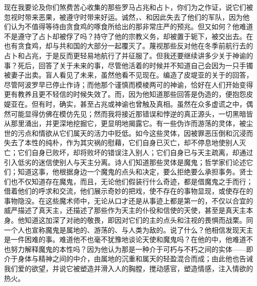 
现在我要论及你们煞费苦心收集的那些罗马占兆和占卜，你们为之作证，说它们被忽视时带来恶果，被遵守时带来好运。诚然，、和因此失去了他们的军队，因为他们认为不值得等待由贪食鸡的啄食所给出的那非常庄严的预兆。但又如何？他难道不是遵守了占卜却被俘了吗？持守了他的宗教义务，却被置于轭下，被交出去。在也有贪食鸡，却与共和国的大部分一起覆灭了。蔑视那些反对他在冬季前航行去的占卜和占兆，于是反而更轻易地航行了并征服了。但我还要继续讲多少关于神谕的事？死后，回答了关于未来的事，尽管他活着的时候并不知道自己会因为一只手镯被妻子出卖。盲人看见了未来，虽然他看不见现在。编造了皮堤亚的关于的回答，尽管阿波罗早已停止作诗；而他那个谨慎而模棱两可的神谕，恰好在人们开始变得更有教养且更不轻信的时候失效了。而，因为他知道那些回答是伪造的，便抱怨皮媞亚在。但有时，确实，甚至占兆或神谕也曾触及真相。虽然在众多虚谎之中，偶然可能显得仿佛在模仿先见；然而我将接近那错误和悖逆的真正源头，一切黑暗皆从那里涌出，并更深地挖掘它，更显明地揭露它。有一些伪诈而游荡的灵体，被尘世的污点和情欲从它们属天的活力中贬低。如今这些灵体，因被罪恶压倒和沉浸而失去了本性的纯朴，作为其灾祸的慰藉，它们自身已灭亡，却不停息地使别人灭亡；它们自身已败坏，却将败坏的错误注入别人；它们自身已与天主疏离，却通过引入低劣的迷信使别人与天主分离。诗人们知道那些灵体是魔鬼；哲学家们论述它们；知道这事，他根据身边一个魔鬼的点头和决定，要么拒绝要么承担事务。贤士们也不仅知道存在魔鬼，而且，无论他们假装行什么奇迹，都是借魔鬼之手而行；借着他们的呼求和交流，他们展示奇妙的把戏，使不存在的事物显现，或使存在的事物隐没。在这些魔术师中，无论从口才还是从事迹上都是第一的，不仅以合宜的威严描述了真天主，还描述了那些作为天主的仆役和信使的天使，甚至是真天主本身。他知道这加深了对祂的敬畏，即因对它们的主的点头和注视的畏惧而战栗。同一个人也宣称魔鬼是属地的、游荡的、与人类为敌的。说了什么？他相信发现天主是一件困难的事。难道他不也毫不犹豫地谈论天使和魔鬼吗？在他的中，他难道不也努力解释魔鬼的本性吗？因为他认为那是一种介于可朽与不朽之间的实体——即介于身体与精神之间的中介，由属地的沉重和属天的轻盈混合而成；由此他也告诫我们爱的欲望，并说它被塑造并滑入人的胸膛，搅动感官，塑造情感，注入情欲的热火。\par


